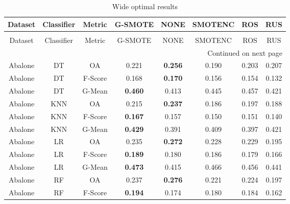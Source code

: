 \begin{longtable}{cccccccc}
\caption{Wide optimal results}
\label{tbl:wide_optimal}\\
\toprule
           Dataset & Classifier &  Metric &        G-SMOTE &           NONE &        SMOTENC &            ROS &            RUS \\
\midrule
\endfirsthead
\caption[]{Wide optimal results} \\
\toprule
           Dataset & Classifier &  Metric &        G-SMOTE &           NONE &        SMOTENC &            ROS &            RUS \\
\midrule
\endhead
\midrule
\multicolumn{8}{r}{{Continued on next page}} \\
\midrule
\endfoot

\bottomrule
\endlastfoot
           Abalone &         DT &      OA &          0.221 & \textbf{0.256} &          0.190 &          0.203 &          0.207 \\
           Abalone &         DT & F-Score &          0.168 & \textbf{0.170} &          0.156 &          0.154 &          0.132 \\
           Abalone &         DT &  G-Mean & \textbf{0.460} &          0.413 &          0.445 &          0.457 &          0.421 \\
           Abalone &        KNN &      OA &          0.215 & \textbf{0.237} &          0.186 &          0.197 &          0.188 \\
           Abalone &        KNN & F-Score & \textbf{0.167} &          0.157 &          0.150 &          0.151 &          0.140 \\
           Abalone &        KNN &  G-Mean & \textbf{0.429} &          0.391 &          0.409 &          0.397 &          0.421 \\
           Abalone &         LR &      OA &          0.235 & \textbf{0.272} &          0.228 &          0.229 &          0.195 \\
           Abalone &         LR & F-Score & \textbf{0.189} &          0.180 &          0.186 &          0.179 &          0.166 \\
           Abalone &         LR &  G-Mean & \textbf{0.473} &          0.415 &          0.466 &          0.456 &          0.441 \\
           Abalone &         RF &      OA &          0.237 & \textbf{0.276} &          0.221 &          0.224 &          0.197 \\
           Abalone &         RF & F-Score & \textbf{0.194} &          0.174 &          0.180 &          0.184 &          0.162 \\

\end{longtable}
